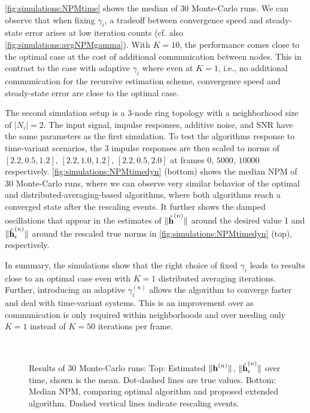 \documentclass{article}
\begin{document}
\autoref{fig:simulations:NPMtime} shows the median of 30 Monte-Carlo runs.
We can observe that when fixing \(\gamma_i\), a tradeoff between convergence speed and steady-state error arises at low iteration counts (cf. also \autoref{fig:simulations:avgNPMgamma}).
With \(K=10\), the performance comes close to the optimal case at the cost of additional communication between nodes.
This in contrast to the case with adaptive \(\gamma_i\) where even at \(K=1\), i.e., no additional communication for the recursive estimation scheme, convergence speed and steady-state error are close to the optimal case.

The second simulation setup is a \(3\)-node ring topology with a neighborhood size of \(|N_i|=2\).
The input signal, impulse responses, additive noise, and SNR have the same parameters as the first simulation.
To test the algorithms response to time-variant scenarios, the 3 impulse responses are then scaled to norms of \([2.2, 0.5, 1.2],\, [2.2, 1.0, 1.2],\, [2.2, 0.5, 2.0]\) at frames \(0,\, 5000,\, 10000\) respectively.
\autoref{fig:simulations:NPMtimedyn} (bottom) shows the median NPM of 30 Monte-Carlo runs, where we can observe very similar behavior of the optimal and distributed-averaging-based algorithms, where both algorithms reach a converged state after the rescaling events.
It further shows the damped oscillations that appear in the estimates of \(\|\hat{\bm{\mathrm{h}}}^{(n)}\|\) around the desired value 1 and \(\|\hat{\bm{\mathrm{h}}}_i^{(n)}\|\) around the rescaled true norms in \autoref{fig:simulations:NPMtimedyn} (top), respectively.

In summary, the simulations show that the right choice of fixed \(\gamma_i\) leads to results close to an optimal case even with \(K=1\) distributed averaging iterations.
Further, introducing an adaptive \(\gamma_i^{(n)}\) allows the algorithm to converge faster and deal with time-variant systems.
This is an improvement over \cite{blochbergerDBSI} as communication is only required within neighborhoods and over \cite{yuDistributedBlindSystem2014, liuDistributedBlindIdentification2016} needing only \(K=1\) instead of \(K=50\) iterations per frame.

\begin{figure}[t]
    \centering
    \\\vspace*{-1.2cm}
    
    \vspace*{-0.6cm}
    \caption[]{Results of 30 Monte-Carlo runs: Top: Estimated \(\|\bm{\mathrm{h}}^{(n)}\|\), \(\|\hat{\bm{\mathrm{h}}}_i^{(n)}\|\) over time, shown is the mean. Dot-dashed lines are true values. Bottom: Median NPM, comparing optimal algorithm and proposed extended algorithm. Dashed vertical lines indicate rescaling events.}
    \label{fig:simulations:NPMtimedyn}
\end{figure}
\end{document}

